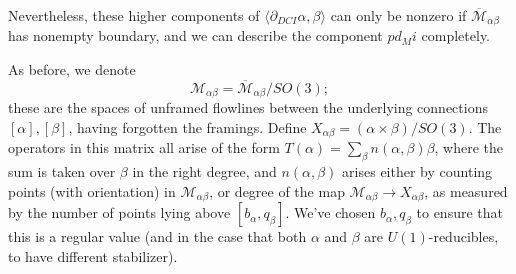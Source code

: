 \documentclass{memo-l}
\theoremstyle{definition}
\theoremstyle{remark}
\numberwithin{section}{chapter}
\numberwithin{equation}{chapter}
\begin{document}
Nevertheless, these higher components of $\langle \partial_{DCI} \alpha, \beta\rangle$ can only be nonzero if $\overline{\mathcal M}_{\alpha \beta}$ has nonempty boundary, and we can describe the component $p d_M i$ completely.

As before, we denote $$\mathcal M_{\alpha\beta} = \overline{\mathcal M}_{\alpha\beta}/SO(3);$$ these are the spaces of unframed flowlines between the underlying connections $[\alpha], [\beta]$, having forgotten the framings. Define $X_{\alpha \beta} = (\alpha \times \beta)/SO(3)$. The operators in this matrix all arise of the form $T(\alpha) = \sum_\beta n(\alpha, \beta) \beta$, where the sum is taken over $\beta$ in the right degree, and $n(\alpha, \beta)$ arises either by counting points (with orientation) in $\mathcal M_{\alpha\beta}$, or degree of the map $\mathcal M_{\alpha\beta} \to X_{\alpha \beta}$, as measured by the number of points lying above $[b_\alpha, q_\beta]$. We've chosen $b_\alpha, q_\beta$ to ensure that this is a regular value (and in the case that both $\alpha$ and $\beta$ are $U(1)$-reducibles, to have different stabilizer). 
\end{document}
